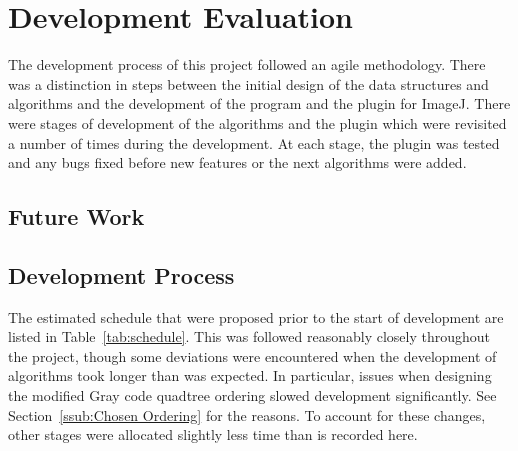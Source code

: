 
\section{Development Evaluation}
\label{sec:development_evaluation}

The development process of this project followed an agile methodology. There
was a distinction in steps between the initial design of the data structures
and algorithms and the development of the program and the plugin for ImageJ.
There were stages of development of the algorithms and the plugin which were
revisited a number of times during the development. At each stage, the plugin
was tested and any bugs fixed before new features or the next algorithms were
added.

\subsection{Future Work}
\label{sub:future_work}


\subsection{Development Process}
\label{sub:development_process}

The estimated schedule that were proposed prior to the start of development
are listed in Table~\ref{tab:schedule}. This was followed reasonably closely
throughout the project, though some deviations were encountered when the
development of algorithms took longer than was expected. In particular, issues
when designing the modified Gray code quadtree ordering slowed development
significantly. See Section~\ref{ssub:Chosen Ordering} for the reasons. To
account for these changes, other stages were allocated slightly less time than
is recorded here.

